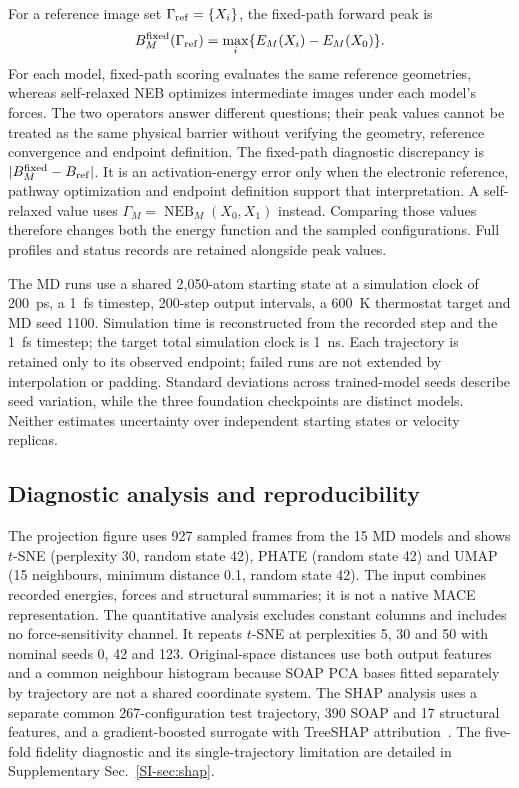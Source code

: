 \documentclass[pdflatex,sn-mathphys-num]{sn-jnl}
\newif\ifreviewcopy
\newcommand{\rev}[2]{\ifreviewcopy{\color{revisionblue}#2\textsuperscript{\scriptsize[R1-#1]}}\else#2\fi}
\begin{document}
For a reference image set $\Gamma_{\rm ref}=\{X_i\}$, the fixed-path forward peak is
\begin{equation}
B_M^{\rm fixed}(\Gamma_{\rm ref})=\max_i\{E_M(X_i)-E_M(X_0)\}.
\end{equation}
For each model, fixed-path scoring evaluates the same reference geometries, whereas self-relaxed NEB optimizes intermediate images under each model's forces. \rev{A1}{The two operators answer different questions; their peak values cannot be treated as the same physical barrier without verifying the geometry, reference convergence and endpoint definition.} The fixed-path diagnostic discrepancy is $|B_M^{\rm fixed}-B_{\rm ref}|$. It is an activation-energy error only when the electronic reference, pathway optimization and endpoint definition support that interpretation. A self-relaxed value uses $\Gamma_M=\operatorname{NEB}_M(X_0,X_1)$ instead. Comparing those values therefore changes both the energy function and the sampled configurations. Full profiles and status records are retained alongside peak values.

The MD runs use a shared 2,050-atom starting state at a simulation clock of 200~ps, a 1~fs timestep, 200-step output intervals, a 600~K thermostat target and MD seed 1100. \rev{C9}{Simulation time is reconstructed from the recorded step and the 1~fs timestep; the target total simulation clock is 1~ns.} Each trajectory is retained only to its observed endpoint; failed runs are not extended by interpolation or padding. Standard deviations across trained-model seeds describe seed variation, while the three foundation checkpoints are distinct models. Neither estimates uncertainty over independent starting states or velocity replicas.

\subsection{Diagnostic analysis and reproducibility}\label{sec:diagnostics}
The projection figure uses 927 sampled frames from the 15 MD models and shows $t$-SNE (perplexity 30, random state 42), PHATE (random state 42) and UMAP (15 neighbours, minimum distance 0.1, random state 42). The input combines recorded energies, forces and structural summaries; it is not a native MACE representation. \rev{C12}{The quantitative analysis excludes constant columns and includes no force-sensitivity channel.} It repeats $t$-SNE at perplexities 5, 30 and 50 with nominal seeds 0, 42 and 123. Original-space distances use both output features and a common neighbour histogram because SOAP PCA bases fitted separately by trajectory are not a shared coordinate system. The SHAP analysis uses a separate common 267-configuration test trajectory, 390 SOAP and 17 structural features, and a gradient-boosted surrogate with TreeSHAP attribution~\citep{lundberg_unified_2017}. The five-fold fidelity diagnostic and its single-trajectory limitation are detailed in Supplementary Sec.~\ref{SI-sec:shap}.
\end{document}
